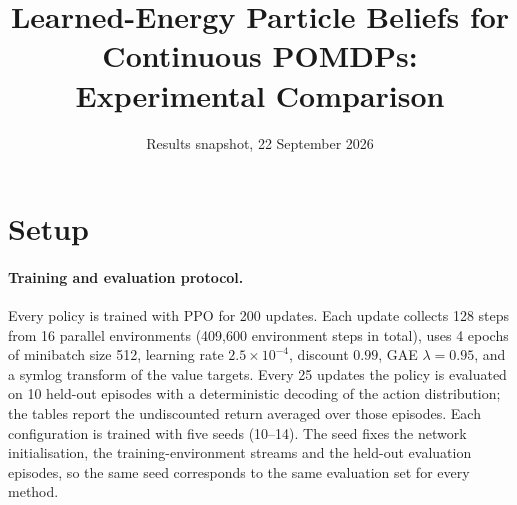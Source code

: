 \documentclass[11pt]{article}
\title{Learned-Energy Particle Beliefs for Continuous POMDPs:\\ Experimental Comparison}
\author{}
\date{Results snapshot, 22 September 2026}
\begin{document}
\maketitle

\section{Setup}
\label{sec:setup}

\paragraph{Training and evaluation protocol.}
Every policy is trained with PPO for 200 updates. Each update collects 128 steps from 16 parallel environments (409{,}600 environment steps in total), uses 4 epochs of minibatch size 512, learning rate $2.5\times10^{-4}$, discount $0.99$, GAE $\lambda = 0.95$, and a symlog transform of the value targets. Every 25 updates the policy is evaluated on 10 held-out episodes with a deterministic decoding of the action distribution; the tables report the undiscounted return averaged over those episodes. Each configuration is trained with five seeds (10--14). The seed fixes the network initialisation, the training-environment streams and the held-out evaluation episodes, so the same seed corresponds to the same evaluation set for every method.
\end{document}
